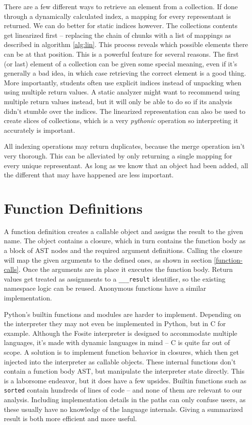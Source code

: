 \documentclass[a4paper, 16pt, oneside]{Thesis}
\begin{document}
There are a few different ways to retrieve an element from a collection.
If done through a dynamically calculated index, a mapping for every
representant is returned. We can do better for static indices however.
The collections contents get linearized first -- replacing the chain of
chunks with a list of mappings as described in algorithm \ref{alg:lin}.
This process reveals which possible elements there can be at that
position. This is a powerful feature for several reasons. The first (or
last) element of a collection can be given some special meaning, even if
it's generally a bad idea, in which case retrieving the correct element
is a good thing. More importantly, students often use explicit indices
instead of unpacking when using multiple return values. A static
analyzer might want to recommend using multiple return values instead,
but it will only be able to do so if its analysis didn't stumble over
the indices. The linearized representation can also be used to create
slices of collections, which is a very \emph{pythonic} operation so
interpreting it accurately is important.

All indexing operations may return duplicates, because the merge
operation isn't very thorough. This can be alleviated by only returning
a single mapping for every unique representant. As long as we know that
an object had been added, all the different that may have happened are
less important.

\section{Function Definitions}\label{function-definitions}

A function definition creates a callable object and assigns the result
to the given name. The object contains a closure, which in turn contains
the function body as a block of AST nodes and the required argument
definitions. Calling the closure will map the given arguments to the
defined ones, as shown in section \ref{function-calls}. Once the
arguments are in place it executes the function body. Return values get
treated as assignments to a \texttt{\_\_\_result} identifier, so the
existing namespace logic can be reused. Anonymous functions have a
similar implementation.

Python's builtin functions and modules are harder to implement.
Depending on the interpreter they may not even be implemented in Python,
but in C for example. Although the Fosite interpreter is designed to
accommodate multiple languages, it's made with dynamic languages in mind
-- C is quite far out of scope. A solution is to implement function
behavior in closures, which then get injected into the interpreter as
callable objects. These internal functions don't contain a function body
AST, but manipulate the interpreter state directly. This is a laborsome
endeavor, but it does have a few upsides. Builtin functions such as
\texttt{sorted} contain hundreds of lines of code -- and none of them
are relevant to our analysis. Including implementation details in the
paths can only confuse users, as these usually have no knowledge of the
language internals. Giving a summarized result is both more efficient
and more useful.
\end{document}
